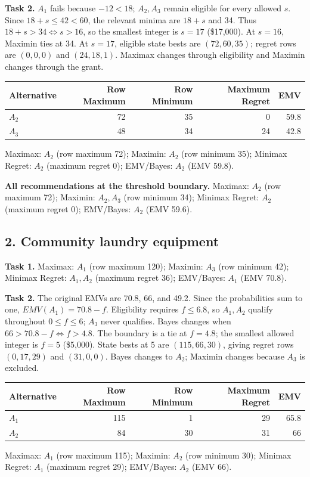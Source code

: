 \textbf{Task 2.} $A_1$ fails because $-12<18$; $A_2,A_3$ remain eligible for every allowed $s$. Since $18+s\leq42<60$, the relevant minima are $18+s$ and 34. Thus $18+s>34\iff s>16$, so the smallest integer is $s=17$ (\$17,000). At $s=16$, Maximin ties at 34. At $s=17$, eligible state bests are $(72,60,35)$; regret rows are $(0,0,0)$ and $(24,18,1)$. Maximax changes through eligibility and Maximin changes through the grant.

\begin{center}\begin{tabular}{lrrrr}\toprule Alternative & Row Maximum & Row Minimum & Maximum Regret & EMV\\\midrule
$A_2$ & 72 & 35 & 0 & 59.8\\
$A_3$ & 48 & 34 & 24 & 42.8\\
\bottomrule\end{tabular}\end{center}
Maximax: $A_2$ (row maximum 72); Maximin: $A_2$ (row minimum 35); Minimax Regret: $A_2$ (maximum regret 0); EMV/Bayes: $A_2$ (EMV 59.8).

\textbf{All recommendations at the threshold boundary.} Maximax: $A_2$ (row maximum 72); Maximin: $A_2,A_3$ (row minimum 34); Minimax Regret: $A_2$ (maximum regret 0); EMV/Bayes: $A_2$ (EMV 59.6).
\subsection*{2. Community laundry equipment}
\textbf{Task 1.} Maximax: $A_1$ (row maximum 120); Maximin: $A_3$ (row minimum 42); Minimax Regret: $A_1,A_2$ (maximum regret 36); EMV/Bayes: $A_1$ (EMV 70.8).

\textbf{Task 2.} The original EMVs are 70.8, 66, and 49.2. Since the probabilities sum to one, $EMV(A_1)=70.8-f$. Eligibility requires $f\leq6.8$, so $A_1,A_2$ qualify throughout $0\leq f\leq6$; $A_3$ never qualifies. Bayes changes when $66>70.8-f\iff f>4.8$. The boundary is a tie at $f=4.8$; the smallest allowed integer is $f=5$ (\$5,000). State bests at 5 are $(115,66,30)$, giving regret rows $(0,17,29)$ and $(31,0,0)$. Bayes changes to $A_2$; Maximin changes because $A_3$ is excluded.

\begin{center}\begin{tabular}{lrrrr}\toprule Alternative & Row Maximum & Row Minimum & Maximum Regret & EMV\\\midrule
$A_1$ & 115 & 1 & 29 & 65.8\\
$A_2$ & 84 & 30 & 31 & 66\\
\bottomrule\end{tabular}\end{center}
Maximax: $A_1$ (row maximum 115); Maximin: $A_2$ (row minimum 30); Minimax Regret: $A_1$ (maximum regret 29); EMV/Bayes: $A_2$ (EMV 66).

